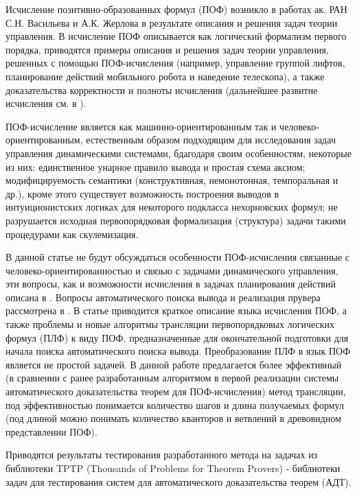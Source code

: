 \documentclass[a4paper]{jctart15b}
\begin{document}
Исчисление позитивно-образованных формул (ПОФ) возникло в работах ак. РАН С.Н. Васильева и А.К. Жерлова \cite{SNV1990,ICDS2000} в результате описания и решения задач теории управления. В \cite{ICDS2000} исчисление ПОФ описывается как логический формализм первого порядка, приводятся примеры описания и решения задач теории управления, решенных с помощью ПОФ-исчисления (например, управление группой лифтов, планирование действий мобильного робота и наведение телескопа), а также доказательства корректности и полноты исчисления (дальнейшее развитие исчисления см. в \cite{jour2}).

ПОФ-исчисление является как машинно-ориентированным так и человеко-ориентированным, естественным образом подходящим для исследования задач управления динамическими системами, бдагодаря своим особенностям, некоторые из них: единственное унарное правило вывода и простая схема аксиом; модифицируемость семантики (конструктивная, немонотонная, темпоральная и др.), кроме этого существует возможность построения выводов в интуиционистских логиках для некоторого подкласса нехорновских формул; не  разрушается исходная первопорядковая формализация (структура) задачи такими процедурами как скулемизация.

В данной статье не будут обсуждаться особенности ПОФ-исчисления связанные с человеко-ориентированностью и связью с задачами динамического управления, эти вопросы, как и возможности исчисления в задачах планирования действий описана в \cite{ICDS2000}. Вопросы автоматического поиска вывода и реализация прувера рассмотрена в \cite{mipro2013}. В статье приводится краткое описание языка исчисления ПОФ, а также проблемы и новые алгоритмы трансляции первопорядковых логических формул (ПЛФ) к виду ПОФ, предназначенные для окончательной подготовки для начала поиска автоматического поиска вывода. Преобразование ПЛФ в язык ПОФ является не простой задачей. В данной работе предлагается более эффективный (в сравнении с ранее разработанным алгоритмом в первой реализации системы автоматического доказательства теорем для ПОФ-исчисления\cite{Cherkashin}) метод трансляции, под эффективностью понимается количество шагов и длина получаемых формул (под длиной можно понимать количество кванторов и ветвлений в древовидном представлении ПОФ).

Приводятся результаты тестирования разработанного метода на задачах из библиотеки TPTP\cite{tptp} (Thousands of Problems for Theorem Provers) - библиотеки задач для тестирования систем для автоматического доказательства теорем (АДТ).
\end{document}
